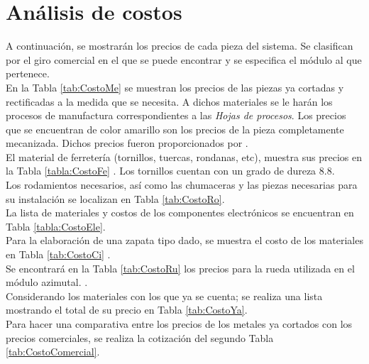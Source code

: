 \newpage
\section{Análisis de costos}

A continuación, se mostrarán los precios de cada pieza del sistema. Se clasifican por el giro comercial en el que se puede encontrar y se especifica el módulo al que pertenece.\\

En la Tabla \ref{tab:CostoMe} se muestran los precios de las piezas ya cortadas y rectificadas a la medida que se necesita. A dichos materiales se le harán los procesos de manufactura correspondientes a las \textit{Hojas de procesos}. Los precios que se encuentran de color amarillo son los precios de la pieza completamente mecanizada. Dichos precios fueron proporcionados por \cite{Metal}.\\

El material de ferretería (tornillos, tuercas, rondanas, etc), muestra sus precios en la Tabla \ref{tabla:CostoFe} \cite{Toledo}. Los tornillos cuentan con un grado de dureza 8.8. \\

Los rodamientos necesarios, así como las chumaceras y las piezas necesarias para su instalación se localizan en Tabla  \ref{tab:CostoRo}.\\

La lista de materiales y costos de los componentes electrónicos se encuentran en Tabla \ref{tabla:CostoEle}.\\

Para la elaboración de una zapata tipo dado, se muestra el costo de los materiales en Tabla \ref{tab:CostoCi} \cite{Zapatita}. \\

Se encontrará en la Tabla \ref{tab:CostoRu} los precios para la rueda utilizada en el módulo azimutal. \cite{Ruedas}.\\

Considerando los materiales con los que ya se cuenta; se realiza una lista mostrando el total de su precio en Tabla  \ref{tab:CostoYa}.\\

Para hacer una comparativa entre los precios de los metales ya cortados con los precios comerciales, se realiza la cotización del segundo Tabla \ref{tab:CostoComercial}\cite{Metal}.\\
\newpage





